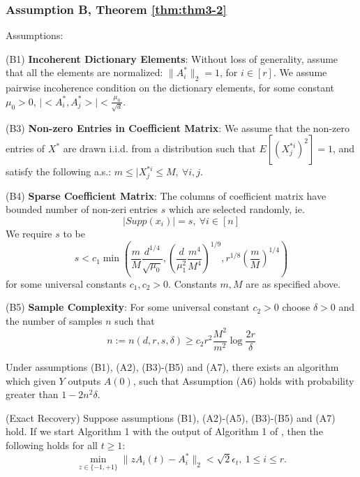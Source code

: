 \subsubsection{Assumption B, Theorem \ref{thm:thm3-2}}

Assumptions:

(B1) \textbf{Incoherent Dictionary Elements}: Without loss of generality, assume that all the elements are normalized: $\lVert A_i^*\rVert_2=1$, for $i\in [r]$. We assume pairwise incoherence condition on the dictionary elements, for some constant $\mu_0>0$, $\lvert <A_i^*,A_j^*>\rvert < \frac{\mu_0}{\sqrt{d}}$.

(B3) \textbf{Non-zero Entries in Coefficient Matrix}: We assume that the non-zero entries of $X^*$ are drawn i.i.d. from a distribution such that $E[(X^{*i}_j)^2]=1$, and satisfy the following a.s.: $m\leq \lvert X^{*i}_j\leq M,~\forall i,j$.

(B4) \textbf{Sparse Coefficient Matrix}: The columns of coefficient matrix have bounded number of non-zeri entries $s$ which are selected randomly, ie.
\begin{equation*}
\lvert Supp(x_i)\rvert =s,~\forall i\in [n]
\end{equation*}
We require $s$ to be
\begin{equation*}
s<c_1\min(\frac{m}{M}\frac{d^{1/4}}{\sqrt{\mu_0}},(\frac{d}{\mu_1^2}\frac{m^4}{M^4})^{1/9},r^{1/8}(\frac{m}{M})^{1/4})
\end{equation*}
for some universal constants $c_1,c_2>0$. Constants $m,M$ are as specified above.

(B5) \textbf{Sample Complexity}: For some universal constant $c_2>0$ choose $\delta >0$ and the number of samples $n$ such that
\begin{equation*}
n:=n(d,r,s,\delta)\geq c_2r^2\frac{M^2}{m^2}\log\frac{2r}{\delta}
\end{equation*}

\begin{theorem}
Under assumptions (B1), (A2), (B3)-(B5) and (A7), there exists an algorithm which given $Y$ outputs $A(0)$, such that Assumption (A6) holds with probability greater than $1-2n^2\delta$.
\label{thm:thm3-2}
\end{theorem}

\begin{corollary}
(Exact Recovery) Suppose assumptions (B1), (A2)-(A5), (B3)-(B5) and (A7) hold. If we start Algorithm 1 with the output of Algorithm 1 of \cite{ref1}, then the following holds for all $t\geq 1$:
\begin{equation*}
\min_{z\in \{-1,+1\}}\lVert zA_i(t)-A_i^*\rVert_2<\sqrt{2}\epsilon_t,~1\leq i \leq r.
\end{equation*}
\label{cor:cor3-1}
\end{corollary}

